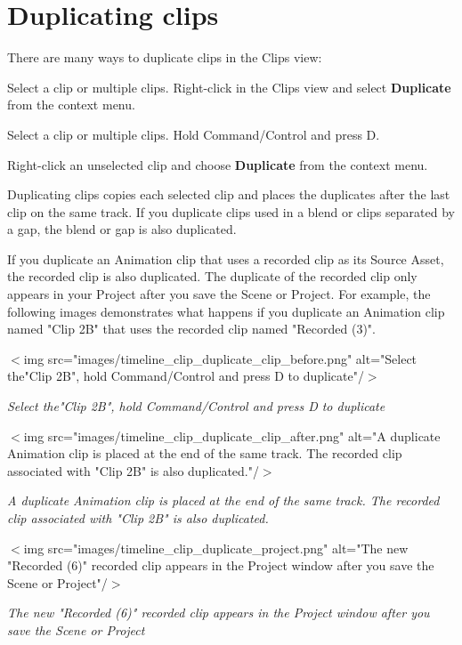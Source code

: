 \chapter{Duplicating clips}
\hypertarget{md__library_2_package_cache_2com_8unity_8timeline_0d1_87_86_2_documentation_0i_2clp__dup}{}\label{md__library_2_package_cache_2com_8unity_8timeline_0d1_87_86_2_documentation_0i_2clp__dup}
\label{md__library_2_package_cache_2com_8unity_8timeline_0d1_87_86_2_documentation_0i_2clp__dup_autotoc_md1110}%
%
 There are many ways to duplicate clips in the Clips view\+:


\begin{DoxyItemize}
\item Select a clip or multiple clips. Right-\/click in the Clips view and select {\bfseries{Duplicate}} from the context menu.
\item Select a clip or multiple clips. Hold Command/\+Control and press D.
\item Right-\/click an unselected clip and choose {\bfseries{Duplicate}} from the context menu.
\end{DoxyItemize}

Duplicating clips copies each selected clip and places the duplicates after the last clip on the same track. If you duplicate clips used in a blend or clips separated by a gap, the blend or gap is also duplicated.

If you duplicate an Animation clip that uses a recorded clip as its Source Asset, the recorded clip is also duplicated. The duplicate of the recorded clip only appears in your Project after you save the Scene or Project. For example, the following images demonstrates what happens if you duplicate an Animation clip named "{}\+Clip 2\+B"{} that uses the recorded clip named "{}\+Recorded (3)"{}.

\texorpdfstring{$<$}{<}img src="{}images/timeline\+\_\+clip\+\_\+duplicate\+\_\+clip\+\_\+before.\+png"{} alt="{}\+Select the"{}Clip 2B"{}, hold Command/\+Control and press D to duplicate"{}/\texorpdfstring{$>$}{>}

{\itshape Select the"{}\+Clip 2\+B"{}, hold Command/\+Control and press D to duplicate}

\texorpdfstring{$<$}{<}img src="{}images/timeline\+\_\+clip\+\_\+duplicate\+\_\+clip\+\_\+after.\+png"{} alt="{}\+A duplicate Animation clip is placed at the end of the same track. The recorded clip associated with "{}Clip 2B"{} is also duplicated."{}/\texorpdfstring{$>$}{>}

{\itshape A duplicate Animation clip is placed at the end of the same track. The recorded clip associated with "{}\+Clip 2\+B"{} is also duplicated.}

\texorpdfstring{$<$}{<}img src="{}images/timeline\+\_\+clip\+\_\+duplicate\+\_\+project.\+png"{} alt="{}\+The new "{}Recorded (6)"{} recorded clip appears in the Project window after you save the Scene or Project"{}/\texorpdfstring{$>$}{>}

{\itshape The new "{}\+Recorded (6)"{} recorded clip appears in the Project window after you save the Scene or Project} 